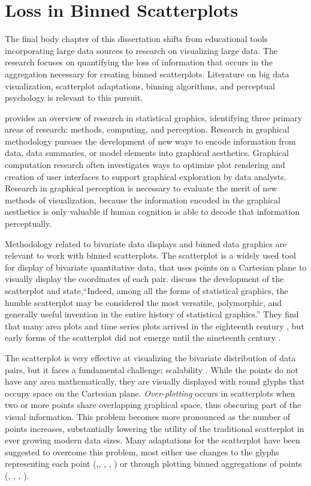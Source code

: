 \section{Loss in Binned Scatterplots}

The final body chapter of this dissertation shifts from educational tools incorporating large data sources to research on visualizing large data. The research focuses on quantifying the loss of information that occurs in the aggregation necessary for creating binned scatterplots. Literature on big data visualization, scatterplot adaptations, binning algorithms, and perceptual psychology is relevant to this pursuit. 

\citet{Cleveland1987} provides an overview of research in statistical graphics, identifying three primary areas of research: methods, computing, and perception. Research in graphical methodology pursues the development of new ways to encode information from data, data summaries, or model elements into graphical aesthetics. Graphical computation research often investigates ways to optimize plot rendering and creation of user interfaces to support graphical exploration by data analysts. Research in graphical perception is necessary to evaluate the merit of new methods of visualization, because the information encoded in the graphical aesthetics is only valuable if human cognition is able to decode that information perceptually. 

Methodology related to bivariate data displays and binned data graphics are relevant to work with binned scatterplots. The scatterplot is a widely used tool for display of bivariate quantitative data, that uses points on a Cartesian plane to visually display the coordinates of each pair. \citet{friendly2005early} discuss the development of the scatterplot and state,``Indeed, among all the forms of statistical graphics, the humble scatterplot may be considered the most versatile, polymorphic, and generally useful invention in the entire history of statistical graphics.'' They find that many area plots and time series plots arrived in the eighteenth century \citep{playfair}, but early forms of the scatterplot did not emerge until the nineteenth century \citep{Herschel1833}. 

The scatterplot is very effective at visualizing the bivariate distribution of data pairs, but it faces a fundamental challenge; scalability \citep{Theus2006}. While the points do not have any area mathematically, they are visually displayed with round glyphs that occupy space on the Cartesian plane. \textit{Over-plotting} occurs in scatterplots when two or more points share overlapping graphical space, thus obscuring part of the visual information. This problem becomes more pronounced as the number of points increases, substantially lowering the utility of the traditional scatterplot in ever growing modern data sizes. Many adaptations for the scatterplot have been suggested to overcome this problem, most either use changes to the glyphs representing each point (\citealt{tukey},\citealt{few2008solutions}, \citealt{Keim2010GenScatter}, \citealt{Hao2010visual}, \citealt{Janetzko2013Ellipse}) or through plotting binned aggregations of points (\citealt{sunflowerplots}, \citealt{Carr1987}, \citealt{Wickham2013Bin}, \citealt{Liu2013imMens}). 

